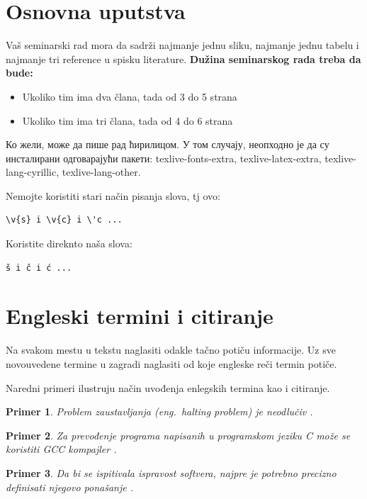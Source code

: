 \documentclass[a4paper]{article}
\newtheorem{primer}{Primer}[section]
\begin{document}
{\clearpage

\section{Osnovna uputstva}
Vaš seminarski rad mora da sadrži najmanje jednu sliku, najmanje jednu tabelu i najmanje tri reference u spisku literature. \textbf{Dužina seminarskog rada treba da bude:}
\begin{itemize}
\item Ukoliko tim ima dva člana, tada od 3 do 5 strana
\item Ukoliko tim ima tri člana, tada od 4 do 6 strana
\end{itemize} 

Ко жели, може да пише рад ћирилицом. У том случају, неопходно је да су инсталирани одговарајући пакети: texlive-fonts-extra, texlive-latex-extra, texlive-lang-cyrillic, texlive-lang-other. 

Nemojte koristiti stari način pisanja slova, tj ovo:
\begin{verbatim}
\v{s} i \v{c} i \'c ...
\end{verbatim}
Koristite direknto naša slova:	
\begin{verbatim}
š i č i ć ... 
\end{verbatim}


\section{Engleski termini i citiranje}	
\label{sec:termini_i_citiranje}

Na svakom mestu u tekstu naglasiti odakle tačno potiču informacije. Uz sve novouvedene termine u zagradi naglasiti od koje engleske reči termin potiče. 

Naredni primeri ilustruju način uvođenja enlegskih termina kao i citiranje.

\begin{primer}
Problem zaustavljanja (eng.~{\em halting problem}) je neodlučiv \cite{haltingproblem}.
\end{primer}

\begin{primer}
Za prevođenje programa napisanih u programskom jeziku C može se koristiti GCC kompajler \cite{gcc}.
\end{primer}

\begin{primer}
 Da bi se ispitivala ispravost softvera, najpre je potrebno precizno definisati njegovo ponašanje \cite{laski2009software}. 
\end{primer}

}
\end{document}
